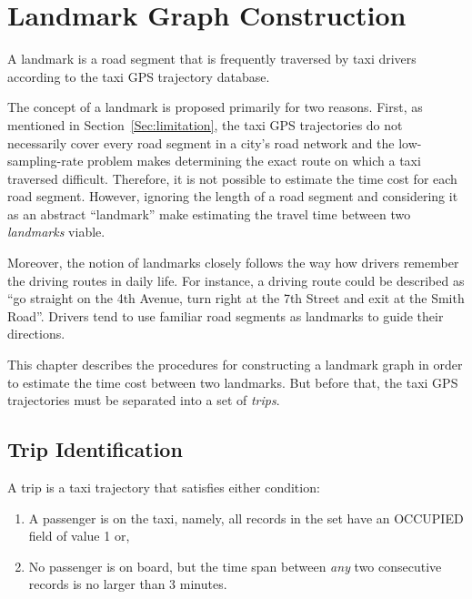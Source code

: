 \chapter{Landmark Graph Construction}\label{Chap:3}
\begin{defn}\label{Def:ldmk}
A landmark is a road segment that is frequently traversed by taxi drivers according to the taxi GPS trajectory database. \cite{TDR10}
\end{defn}

The concept of a landmark is proposed primarily for two reasons. First, as mentioned in Section~\ref{Sec:limitation}, the taxi GPS trajectories do not necessarily cover every road segment in a city's road network and the low-sampling-rate problem makes determining the exact route on which a taxi traversed difficult. Therefore, it is not possible to estimate the time cost for each road segment. However, ignoring the length of a road segment and considering it as an abstract ``landmark'' make estimating the travel time between two \emph{landmarks} viable. 

Moreover, the notion of landmarks closely follows the way how drivers remember the driving routes in daily life\cite{TDR10}. For instance, a driving route could be described as ``go straight on the 4th Avenue, turn right at the 7th Street and exit at the Smith Road''. Drivers tend to use familiar road segments as landmarks to guide their directions.

This chapter describes the procedures for constructing a landmark graph in order to estimate the time cost between two landmarks. But before that, the taxi GPS trajectories must be separated into a set of \emph{trips}.

\section{Trip Identification}
\begin{defn}\label{Def:trip}
A trip is a taxi trajectory that satisfies either condition:
\begin{enumerate}
\item A passenger is on the taxi, namely, all records in the set have an OCCUPIED field of value 1 or, 
\item No passenger is on board, but the time span between \emph{any} two consecutive records is no larger than 3 minutes.
\end{enumerate}
\end{defn}

